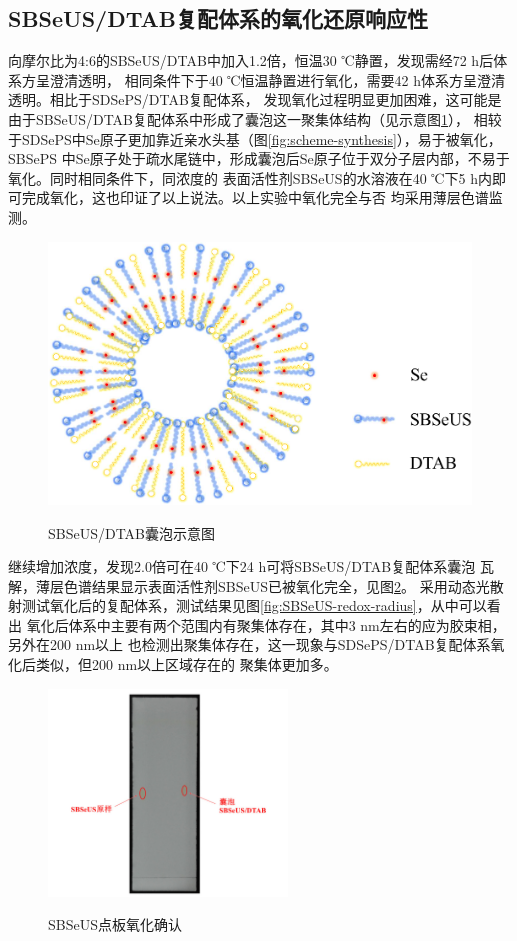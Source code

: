 \documentclass[bachelor,fandolfonts,replaceperiod]{jnuthesis}
\begin{document}
    \subsection{SBSeUS/DTAB复配体系的氧化还原响应性}
    向摩尔比为4:6的SBSeUS/DTAB中加入1.2倍，恒温30 ℃静置，发现需经72 h后体系方呈澄清透明，
    相同条件下于40 ℃恒温静置进行氧化，需要42 h体系方呈澄清透明。相比于SDSePS/DTAB复配体系，
    发现氧化过程明显更加困难，这可能是由于SBSeUS/DTAB复配体系中形成了囊泡这一聚集体结构（见示意图\ref{fig:scheme-vesicle}），
    相较于SDSePS中Se原子更加靠近亲水头基（图\ref{fig:scheme-synthesis}），易于被氧化，SBSePS
    中Se原子处于疏水尾链中，形成囊泡后Se原子位于双分子层内部，不易于氧化。同时相同条件下，同浓度的
    表面活性剂SBSeUS的水溶液在40 ℃下5 h内即可完成氧化，这也印证了以上说法。以上实验中氧化完全与否
    均采用薄层色谱监测。
    \begin{figure}[htbp]
        \centering
        \includegraphics[width=0.46\linewidth]{figure/vesicle-scheme.pdf}\\
        \caption{SBSeUS/DTAB囊泡示意图}\label{fig:scheme-vesicle}
    \end{figure}
    
    继续增加浓度，发现2.0倍可在40 ℃下24 h可将SBSeUS/DTAB复配体系囊泡
    瓦解，薄层色谱结果显示表面活性剂SBSeUS已被氧化完全，见图\ref{fig:SBSeUS-Ox-tlc}。
    采用动态光散射测试氧化后的复配体系，测试结果见图\ref{fig:SBSeUS-redox-radius}，从中可以看出
    氧化后体系中主要有两个范围内有聚集体存在，其中3 nm左右的应为胶束相，另外在200 nm以上
    也检测出聚集体存在，这一现象与SDSePS/DTAB复配体系氧化后类似，但200 nm以上区域存在的
    聚集体更加多。
    \begin{figure}[htbp]
        \centering
        \includegraphics[height=5.5cm]{figure/SBSeUS-Ox-tlc}\\
        \caption{SBSeUS点板氧化确认}\label{fig:SBSeUS-Ox-tlc}
    \end{figure}
    
\end{document}
